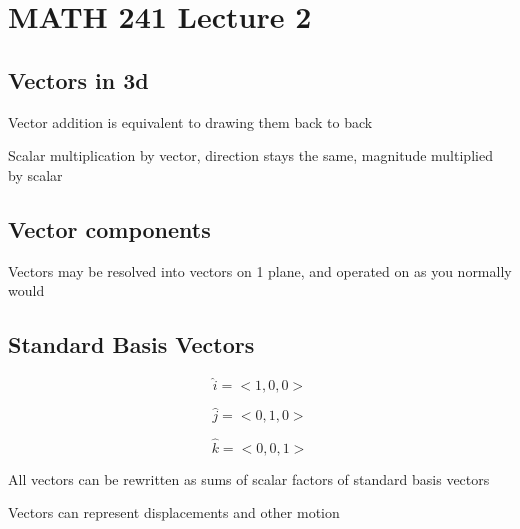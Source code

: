 \documentclass[12pt]{report}
\begin{document}
\chapter*{MATH 241 Lecture 2}
\section*{Vectors in 3d} 

Vector addition is equivalent to drawing them back to back

Scalar multiplication by vector, direction stays the same, magnitude multiplied by scalar

\section*{Vector components} 

Vectors may be resolved into vectors on 1 plane, and operated on as you normally would

\section*{Standard Basis Vectors}

$$\hat{i} = <1,0,0>$$

$$\hat{j} = <0,1,0>$$

$$\hat{k} = <0,0,1>$$

All vectors can be rewritten as sums of scalar factors of standard basis vectors

Vectors can represent displacements and other motion
\end{document}
